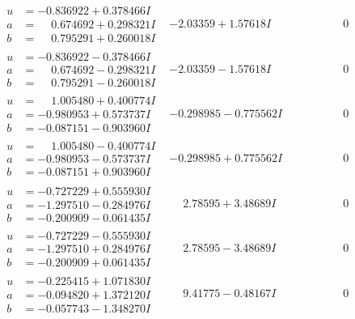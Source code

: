 \documentclass[1p]{elsarticle_modified}
\theoremstyle{definition}
\begin{document}
$$\begin{array}{c|c|c}
\begin{aligned}
u &= -0.836922 + 0.378466 I \\
a &= \phantom{-}0.674692 + 0.298321 I \\
b &= \phantom{-}0.795291 + 0.260018 I\end{aligned}
 & -2.03359 + 1.57618 I & \phantom{-0.000000 } 0 \\ \hline\begin{aligned}
u &= -0.836922 - 0.378466 I \\
a &= \phantom{-}0.674692 - 0.298321 I \\
b &= \phantom{-}0.795291 - 0.260018 I\end{aligned}
 & -2.03359 - 1.57618 I & \phantom{-0.000000 } 0 \\ \hline\begin{aligned}
u &= \phantom{-}1.005480 + 0.400774 I \\
a &= -0.980953 + 0.573737 I \\
b &= -0.087151 - 0.903960 I\end{aligned}
 & -0.298985 - 0.775562 I & \phantom{-0.000000 } 0 \\ \hline\begin{aligned}
u &= \phantom{-}1.005480 - 0.400774 I \\
a &= -0.980953 - 0.573737 I \\
b &= -0.087151 + 0.903960 I\end{aligned}
 & -0.298985 + 0.775562 I & \phantom{-0.000000 } 0 \\ \hline\begin{aligned}
u &= -0.727229 + 0.555930 I \\
a &= -1.297510 - 0.284976 I \\
b &= -0.200909 - 0.061435 I\end{aligned}
 & \phantom{-}2.78595 + 3.48689 I & \phantom{-0.000000 } 0 \\ \hline\begin{aligned}
u &= -0.727229 - 0.555930 I \\
a &= -1.297510 + 0.284976 I \\
b &= -0.200909 + 0.061435 I\end{aligned}
 & \phantom{-}2.78595 - 3.48689 I & \phantom{-0.000000 } 0 \\ \hline\begin{aligned}
u &= -0.225415 + 1.071830 I \\
a &= -0.094820 + 1.372120 I \\
b &= -0.057743 - 1.348270 I\end{aligned}
 & \phantom{-}9.41775 - 0.48167 I & \phantom{-0.000000 } 0 \\ \hline\begin{aligned}

\end{aligned}
\end{array}$$
\end{document}
